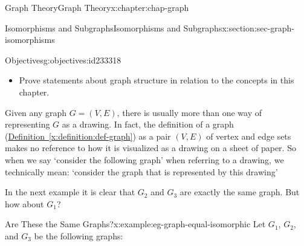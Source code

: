 \documentclass[oneside,10pt,]{book}
\newcommand{\xreffont}{\relax}
\numberwithin{equation}{section}
\begin{document}
\begin{chapterptx}{Graph Theory}{}{Graph Theory}{}{}{x:chapter:chap-graph}
\begin{sectionptx}{Isomorphisms and Subgraphs}{}{Isomorphisms and Subgraphs}{}{}{x:section:sec-graph-isomorphisms}
\begin{objectives}{Objectives}{g:objectives:id233318}
\begin{itemize}[label=\textbullet]
\item{}Prove statements about graph structure in relation to the concepts in this chapter.%
\end{itemize}
\end{objectives}
Given any graph \(G = (V,E)\), there is usually more than one way of representing \(G\) as a drawing. In fact, the definition of a graph (\hyperref[x:definition:def-graph]{Definition~{\xreffont\ref{x:definition:def-graph}}}) as a pair \((V,E)\) of vertex and edge sets makes no reference to how it is visualized as a drawing on a sheet of paper. So when we say `consider the following graph' when referring to a drawing, we technically mean: `consider the graph that is represented by this drawing\textellipsis{}'%
\par
In the next example it is clear that \(G_2\) and \(G_3\) are exactly the same graph. But how about \(G_1\)?%
\begin{example}{Are These the Same Graphs?}{x:example:eg-graph-equal-isomorphic}%
Let \(G_1\), \(G_2\), and \(G_3\) be the following graphs:%
\begin{sidebyside}{3}{0.0666666666666667}{0.0666666666666667}{0.133333333333333}%
\begin{sbspanel}{0.2}%
\end{sbspanel}
\end{sidebyside}
\end{example}
\end{sectionptx}
\end{chapterptx}
\end{document}
